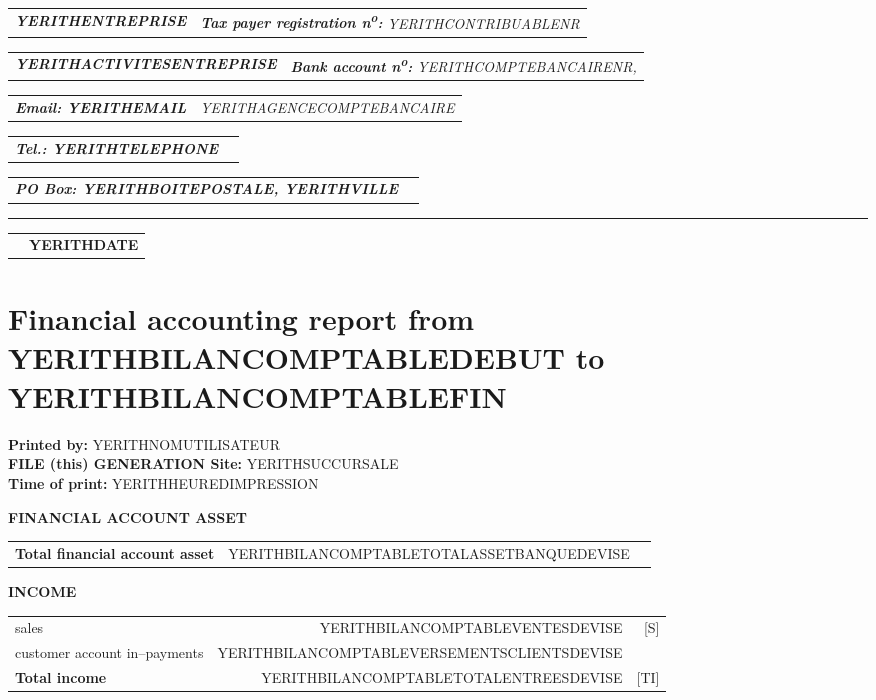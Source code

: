 \documentclass[10pt,YERITHPAPERSPEC,landscape]{article} %
\makeatletter
\newcommand{\headerrow}[2]
{\begin{tabular*}{\linewidth}{l@{\extracolsep{\fill}}r}
	#1 &
	#2 \\
\end{tabular*}}
\newcommand{\emphbold}[1]{\textbf{\emph{#1}}\xspace}
\makeatother
\begin{document}
\bigskip

\headerrow
	{\emphbold{YERITHENTREPRISE}}
	{\emph{\textbf{Tax payer registration n\textsuperscript{o}:} YERITHCONTRIBUABLENR}}
\headerrow
	{\emphbold{YERITHACTIVITESENTREPRISE}}
	{\emph{\textbf{Bank account n\textsuperscript{o}:} YERITHCOMPTEBANCAIRENR,}}
\headerrow
	{\emphbold{Email: YERITHEMAIL}}
	{\emph{YERITHAGENCECOMPTEBANCAIRE}}
\headerrow
	{\emphbold{Tel.: YERITHTELEPHONE}}
	{}
\headerrow
	{\emphbold{PO Box: YERITHBOITEPOSTALE, YERITHVILLE}}
	{}
	
\hrule

\headerrow
	{}
	{\textbf{YERITHDATE}}

\section*{Financial accounting report from YERITHBILANCOMPTABLEDEBUT to YERITHBILANCOMPTABLEFIN}

\textbf{Printed by:} YERITHNOMUTILISATEUR\\
\textbf{FILE (this) GENERATION Site:} YERITHSUCCURSALE\\
\textbf{Time of print:} YERITHHEUREDIMPRESSION\\

\vspace*{0.15em}

\textbf{FINANCIAL ACCOUNT ASSET}
\begin{table}[!htbp]
\begin{tabular}{lrr}
\textbf{Total financial account asset}  	&  YERITHBILANCOMPTABLETOTALASSETBANQUEDEVISE &  \\	 
\end{tabular}
\end{table}

\vspace*{0.15em}
\textbf{INCOME}
\begin{table}[!htbp]
\begin{tabular}{lrr}
sales  				&  YERITHBILANCOMPTABLEVENTESDEVISE  			& [S] \\ 
customer account in--payments  	&  YERITHBILANCOMPTABLEVERSEMENTSCLIENTSDEVISE  & \\ \hline
\textbf{Total income}  		&  YERITHBILANCOMPTABLETOTALENTREESDEVISE & [TI] \\	 
\end{tabular}
\end{table}
\end{document}
